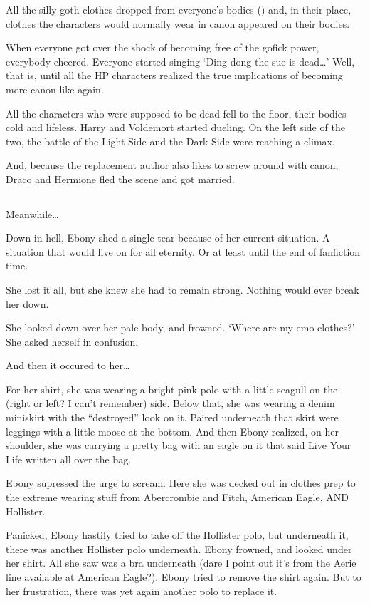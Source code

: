 All the silly goth clothes dropped from everyone's bodies () and, in their place, clothes the characters would normally wear in canon appeared on their bodies.

\begin{sloppypar}
    When everyone got over the shock of becoming free of the gofick power, everybody cheered. Everyone started singing \enquote*{Ding dong the sue is dead\ldots} Well, that is, until all the HP characters realized the true implications of becoming more canon like again.
\end{sloppypar}

All the characters who were supposed to be dead fell to the floor, their bodies cold and lifeless. Harry and Voldemort started dueling. On the left side of the two, the battle of the Light Side and the Dark Side were reaching a climax.

And, because the replacement author also likes to screw around with canon, Draco and Hermione fled the scene and got married.

\rule{1in}{0.4pt}

Meanwhile\ldots

Down in hell, Ebony shed a single tear because of her current situation. A situation that would live on for all eternity. Or at least until the end of fanfiction time.

She lost it all, but she knew she had to remain strong. Nothing would ever break her down.

She looked down over her pale body, and frowned. \enquote*{Where are my emo clothes?} She asked herself in confusion.

And then it occured to her\ldots

For her shirt, she was wearing a bright pink polo with a little seagull on the (right or left? I can't remember) side. Below that, she was wearing a denim miniskirt with the \enquote{destroyed} look on it. Paired underneath that skirt were leggings with a little moose at the bottom. And then Ebony realized, on her shoulder, she was carrying a pretty bag with an eagle on it that said Live Your Life written all over the bag.

Ebony supressed the urge to scream. Here she was decked out in clothes prep to the extreme wearing stuff from Abercrombie and Fitch, American Eagle, AND Hollister.

\begin{sloppypar}
    Panicked, Ebony hastily tried to take off the Hollister polo, but underneath it, there was another Hollister polo underneath. Ebony frowned, and looked under her shirt. All she saw was a bra underneath (dare I point out it's from the Aerie line available at American Eagle?). Ebony tried to remove the shirt again. But to her frustration, there was yet again another polo to replace it.
\end{sloppypar}

